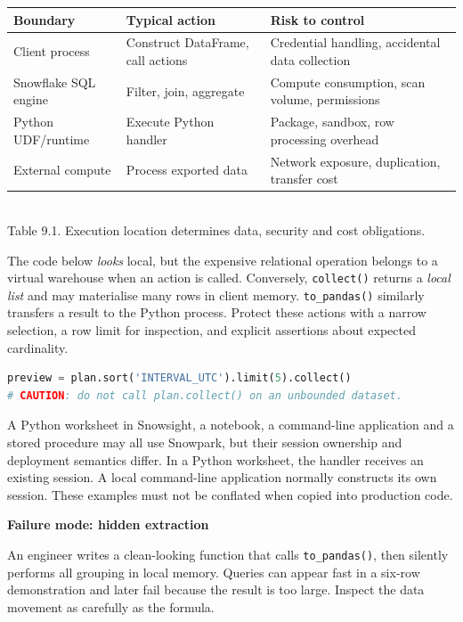 \documentclass[11pt,twoside]{article}
\begin{document}
\begin{center}\renewcommand{\arraystretch}{1.12}\begin{tabularx}{\linewidth}{@{}p{26mm}p{29mm}X@{}}\toprule
\textbf{Boundary}&\textbf{Typical action}&\textbf{Risk to control}\\\midrule
Client process&Construct DataFrame, call actions&Credential handling, accidental data collection\\
Snowflake SQL engine&Filter, join, aggregate&Compute consumption, scan volume, permissions\\
Python UDF/runtime&Execute Python handler&Package, sandbox, row processing overhead\\
External compute&Process exported data&Network exposure, duplication, transfer cost\\\bottomrule
\end{tabularx}\\{\fontsize{8}{9.5}\selectfont\color{inkgray}Table 9.1. Execution location determines data, security and cost obligations.}\end{center}
The code below \emph{looks} local, but the expensive relational operation belongs to a virtual warehouse when an action is called. Conversely, \texttt{collect()} returns a \emph{local list} and may materialise many rows in client memory. \texttt{to\_pandas()} similarly transfers a result to the Python process. Protect these actions with a narrow selection, a row limit for inspection, and explicit assertions about expected cardinality.
\begin{lstlisting}[language=Python,caption={Safe inspection versus unbounded client materialisation.}]
preview = plan.sort('INTERVAL_UTC').limit(5).collect()
# CAUTION: do not call plan.collect() on an unbounded dataset.
\end{lstlisting}
A Python worksheet in Snowsight, a notebook, a command-line application and a stored procedure may all use Snowpark, but their session ownership and deployment semantics differ. In a Python worksheet, the handler receives an existing session. A local command-line application normally constructs its own session. These examples must not be conflated when copied into production code.
\begin{insight}\textbf{Failure mode: hidden extraction}\par
An engineer writes a clean-looking function that calls \texttt{to\_pandas()}, then silently performs all grouping in local memory. Queries can appear fast in a six-row demonstration and later fail because the result is too large. Inspect the data movement as carefully as the formula.\end{insight}
\end{document}

